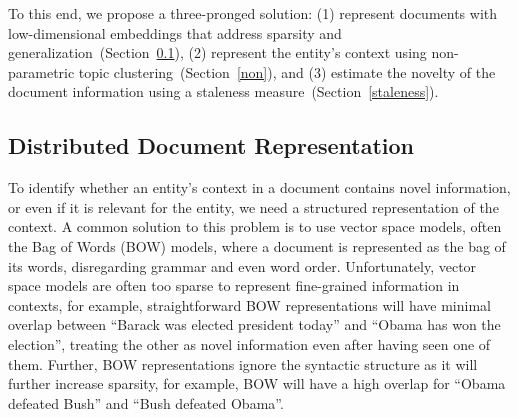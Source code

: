\documentclass{sig-alternate}
\begin{document}
To this end, we propose a three-pronged solution:
(1) represent documents with low-dimensional embeddings that address sparsity and generalization~(Section~\ref{docwordemb}), 
(2) represent the entity's context using non-parametric topic clustering~(Section~\ref{non}), and 
(3) estimate the novelty of the document information using a staleness measure~(Section~\ref{staleness}).


\subsection{Distributed Document Representation}
\label{docwordemb}

To identify whether an entity's context in a document contains novel information, or even if it is relevant for the entity, we need a structured representation of the context. %
A common solution to this problem is to use vector space models, often the Bag of Words (BOW) models, where a document is represented as the bag of its words, disregarding grammar and even word order. 
Unfortunately, vector space models are often too sparse to represent fine-grained information in contexts, for example, straightforward BOW representations will have minimal overlap between ``Barack was elected president today'' and ``Obama has won the election'', treating the other as novel information even after having seen one of them.
Further, BOW representations ignore the syntactic structure as it will further increase sparsity, for example, BOW will have a high overlap for ``Obama defeated Bush'' and ``Bush defeated Obama''.
\end{document}
